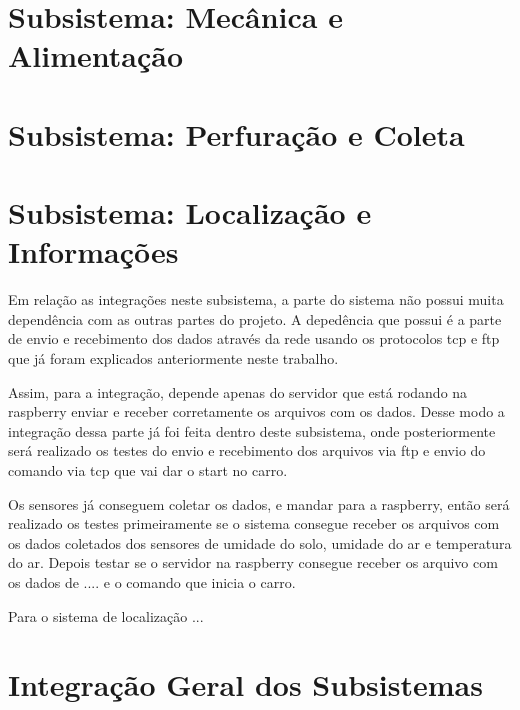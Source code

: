 \section{Subsistema: Mecânica e Alimentação}

\section{Subsistema: Perfuração e Coleta}

\section{Subsistema: Localização e Informações}

Em relação as integrações neste subsistema, a parte do sistema não possui muita dependência com as outras partes do projeto. A depedência que possui é a parte de envio e recebimento dos dados através da rede usando os protocolos tcp e ftp que já foram explicados anteriormente neste trabalho.

Assim, para a integração, depende apenas do servidor que está rodando na raspberry enviar e receber corretamente os arquivos com os dados. Desse modo a integração dessa parte já foi feita dentro deste subsistema, onde posteriormente será realizado os testes do envio e recebimento dos arquivos via ftp e envio do comando via tcp que vai dar o start no carro. 

Os sensores já conseguem coletar os dados, e mandar para a raspberry, então será realizado os testes primeiramente se o sistema consegue receber os arquivos com os dados coletados dos sensores de umidade do solo, umidade do ar e temperatura do ar. Depois testar se o servidor na raspberry consegue receber os arquivo com os dados de .... e o comando que inicia o carro.

Para o sistema de localização ...

\section{Integração Geral dos Subsistemas}


